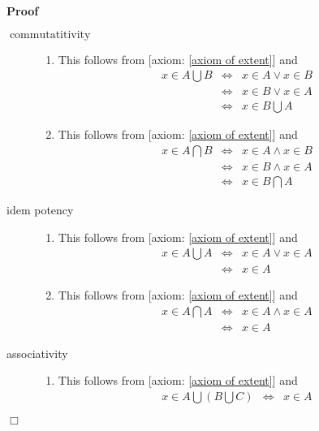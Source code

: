 \documentclass{book}
\newcommand{\tmop}[1]{\ensuremath{\operatorname{#1}}}
\newenvironment{proof}{\noindent\textbf{Proof\ }}{\hspace*{\fill}$\Box$\medskip}
\begin{document}
\begin{proof}
  
  \begin{description}
    \item[$\tmop{commutatitivity}$]
    \begin{enumerate}
      \item This follows from [axiom: \ref{axiom of extent}] and
      \begin{eqnarray*}
        x \in A \bigcup B & \Leftrightarrow & x \in A \vee x \in B\\
        & \Leftrightarrow & x \in B \vee x \in A\\
        & \Leftrightarrow & x \in B \bigcup A
      \end{eqnarray*}
      \item This follows from [axiom: \ref{axiom of extent}] and
      \begin{eqnarray*}
        x \in A \bigcap B & \Leftrightarrow & x \in A \wedge x \in B\\
        & \Leftrightarrow & x \in B \wedge x \in A\\
        & \Leftrightarrow & x \in B \bigcap A
      \end{eqnarray*}
    \end{enumerate}
    \item[idem potency] 
    \begin{enumerate}
      \item This follows from [axiom: \ref{axiom of extent}] and
      \begin{eqnarray*}
        x \in A \bigcup A & \Leftrightarrow & x \in A \vee x \in A\\
        & \Leftrightarrow & x \in A
      \end{eqnarray*}
      \item This follows from [axiom: \ref{axiom of extent}] and
      \begin{eqnarray*}
        x \in A \bigcap A & \Leftrightarrow & x \in A \wedge x \in A\\
        & \Leftrightarrow & x \in A
      \end{eqnarray*}
    \end{enumerate}
    \item[associativity] 
    \begin{enumerate}
      \item This follows from [axiom: \ref{axiom of extent}] and
      \begin{eqnarray*}
        x \in A \bigcup \left( B \bigcup C \right) & \Leftrightarrow & x \in A

\end{eqnarray*}
\end{enumerate}
\end{description}
\end{proof}
\end{document}
